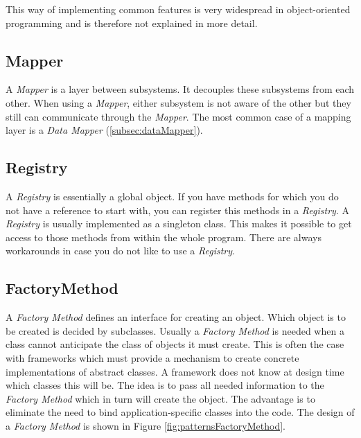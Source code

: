 			This way of implementing common features is very widespread in object-oriented
			programming and is therefore not explained in more detail.

		\subsection{Mapper}
		\label{subsec:mapper}
			A \textit{Mapper} is a layer between subsystems. It decouples these subsystems from each other. When
			using a \textit{Mapper}, either subsystem is not aware of the other but they still can communicate
			through the \textit{Mapper}. The most common case of a mapping layer is a \textit{Data Mapper}
			(\ref{subsec:dataMapper}).
				
		\subsection{Registry}
		\label{subsec:registry}
			A \textit{Registry} is essentially a global object. If you have methods for which
			you do not have a reference to start with, you can register this methods in a
			\textit{Registry}. A \textit{Registry} is usually implemented as a singleton class. This 
			makes it possible to get access to those methods from within the whole program. There are
			always workarounds in case you do not like to use a \textit{Registry}.
			
		\subsection{FactoryMethod}
		\label{subsec:factoryMethod}
			A \textit{Factory Method} defines an interface for creating an object. Which object
			is to be created is decided by subclasses. Usually a \textit{Factory Method} is needed
			when a class cannot anticipate the class of objects it must create. This is often the
			case with frameworks which must provide a mechanism to create concrete implementations
			of abstract classes. A framework does not know at design time which classes this will be.
			The idea is to pass all needed information to the \textit{Factory Method} which in turn
			will create the object. The advantage is to eliminate the need to bind application-specific
			classes into the code.
			The design of a \textit{Factory Method} is shown in Figure \ref{fig:patternsFactoryMethod}.
			
